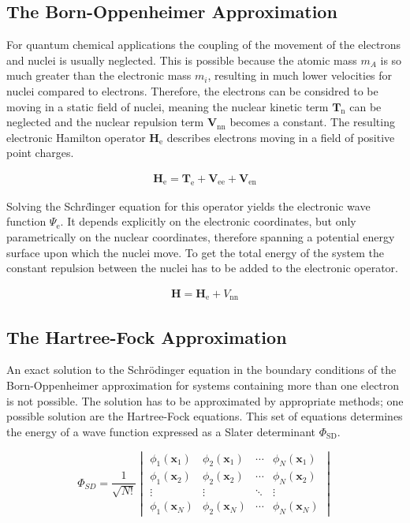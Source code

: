 \subsection{The Born-Oppenheimer Approximation}

For quantum chemical applications the coupling of the movement of the electrons
and nuclei is usually neglected. This is possible because the atomic mass $m_A$
is so much greater than the electronic mass $m_i$, resulting in much lower
velocities for nuclei compared to electrons. Therefore, the electrons can be
considred to be moving in a static field of nuclei, meaning the nuclear kinetic
term $\mathbf{T}_\text{n}$ can be neglected and the nuclear repulsion term
$\mathbf{V}_\text{nn}$ becomes a constant. The resulting electronic Hamilton
operator $\mathbf{H}_\text{e}$ describes electrons moving in a field of
positive point charges.

\begin{align}
    \mathbf{H}_\text{e}=\mathbf{T}_\text{e} + \mathbf{V}_\text{ee} + \mathbf{V}_\text{en}
\end{align}

Solving the Schr\"dinger equation for this operator yields the electronic wave
function $\Psi_\text{e}$. It depends explicitly on the electronic coordinates,
but only parametrically on the nuclear coordinates, therefore spanning a
potential energy surface upon which the nuclei move. To get the total energy of
the system the constant repulsion between the nuclei has to be added to the
electronic operator.

\begin{align}
    \mathbf{H}=\mathbf{H}_\text{e}+V_\text{nn}\label{eqn:hamiltonoperatorfinal}
\end{align}

\subsection{The Hartree-Fock Approximation}

An exact solution to the Schr\"odinger equation in the boundary conditions of
the Born-Oppenheimer approximation for systems containing more than one
electron is not possible. The solution has to be approximated by appropriate
methods; one possible solution are the Hartree-Fock equations. This set of
equations determines the energy of a wave function expressed as a Slater
determinant $\Phi_\text{SD}$.

\begin{equation}
     \Phi_{SD}=\frac{1}{\sqrt{N!}}
     \begin{vmatrix}
         \phi_1(\mathbf{x}_1) & \phi_2(\mathbf{x}_1) & \cdots & \phi_N(\mathbf{x}_1)\\
         \phi_1(\mathbf{x}_2) & \phi_2 (\mathbf{x}_2) & \cdots & \phi_N(\mathbf{x}_2)\\
         \vdots & \vdots & \ddots & \vdots\\
         \phi_1(\mathbf{x}_N) & \phi_2(\mathbf{x}_N) & \cdots & \phi_N(\mathbf{x}_N)
     \end{vmatrix}
     \label{eqn:SlaterDet}
\end{equation}

